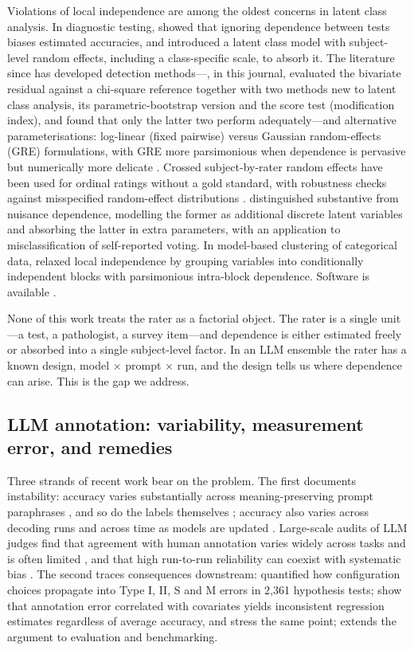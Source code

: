 Violations of local independence are among the oldest concerns in latent class analysis. In diagnostic testing, \citet{Vacek1985} showed that ignoring dependence between tests biases estimated accuracies, and \citet{Qu1996} introduced a latent class model with subject-level random effects, including a class-specific scale, to absorb it. The literature since has developed detection methods---\citet{Oberski2013}, in this journal, evaluated the bivariate residual against a chi-square reference together with two methods new to latent class analysis, its parametric-bootstrap version and the score test (modification index), and found that only the latter two perform adequately---and alternative parameterisations: log-linear (fixed pairwise) versus Gaussian random-effects (GRE) formulations, with GRE more parsimonious when dependence is pervasive but numerically more delicate \citep{Xu2019}. Crossed subject-by-rater random effects have been used for ordinal ratings without a gold standard, with robustness checks against misspecified random-effect distributions \citep{Xie2014}. \citet{Oberski2016} distinguished substantive from nuisance dependence, modelling the former as additional discrete latent variables and absorbing the latter in extra parameters, with an application to misclassification of self-reported voting. In model-based clustering of categorical data, \citet{Marbac2016} relaxed local independence by grouping variables into conditionally independent blocks with parsimonious intra-block dependence. Software is available \citep[randomLCA;][]{Beath2017}.

None of this work treats the rater as a factorial object. The rater is a single unit---a test, a pathologist, a survey item---and dependence is either estimated freely or absorbed into a single subject-level factor. In an LLM ensemble the rater has a known design, model $\times$ prompt $\times$ run, and the design tells us where dependence can arise. This is the gap we address.

\subsection{LLM annotation: variability, measurement error, and remedies}

Three strands of recent work bear on the problem. The first documents instability: accuracy varies substantially across meaning-preserving prompt paraphrases \citep{Liu2026}, and so do the labels themselves \citep{Barrie2024}; accuracy also varies across decoding runs \citep{Atil2024} and across time as models are updated \citep{Barrie2025}. Large-scale audits of LLM judges find that agreement with human annotation varies widely across tasks and is often limited \citep{Bavaresco2025}, and that high run-to-run reliability can coexist with systematic bias \citep{Norman2026}. The second traces consequences downstream: \citet{Baumann2025} quantified how configuration choices propagate into Type I, II, S and M errors in 2,361 hypothesis tests; \citet{Egami2024} show that annotation error correlated with covariates yields inconsistent regression estimates regardless of average accuracy, and \citet{Camuffo2026} stress the same point; \citet{Messing2026} extends the argument to evaluation and benchmarking.

